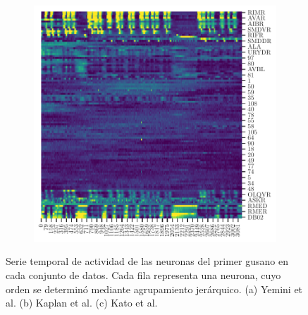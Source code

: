 \begin{figure}
\begin{subfigure}[b]{0.3\textwidth}
 		\caption{}
 		\label{fig:cluster_kaplan}
 	\end{subfigure}
 	\begin{subfigure}[b]{0.3\textwidth}
 		\centering
 		\includegraphics[width=\textwidth]{cluster_kato.pdf}
 		\caption{}
 		\label{fig:cluster_kato}
 	\end{subfigure}
 	\caption[Serie temporal de actividad de las neuronas del primer gusano en cada conjunto de datos.]{ Serie temporal de actividad de las neuronas del primer gusano en cada conjunto de datos. Cada fila representa una neurona, cuyo orden se determinó mediante agrupamiento jerárquico. (a) Yemini et al. (b) Kaplan et al. (c) Kato et al.}\label{fig:seriedatos}
 \end{figure}
 
